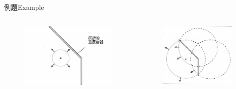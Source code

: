 \documentclass[beamer=true]{standalone}
\begin{document}
\begin{frame}{例題Example}
    \begin{columns}
        \begin{figure}
            \centering
            \includegraphics[width=1\linewidth]{images/Screenshot 2023-09-27 at 5.58.33 PM.png}
        \end{figure}
        \begin{figure}
            \centering
            \includegraphics[width=1\linewidth]{images/Screenshot 2023-09-27 at 5.58.44 PM.png}
        \end{figure}
    \end{columns}


\end{frame}
\end{document}
